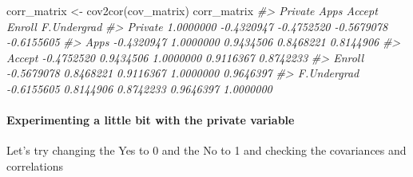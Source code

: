 \documentclass[
]{article}
\newenvironment{Shaded}{\begin{snugshade}}{\end{snugshade}}
\newcommand{\CommentTok}[1]{\textcolor[rgb]{0.56,0.35,0.01}{\textit{#1}}}
\newcommand{\DecValTok}[1]{\textcolor[rgb]{0.00,0.00,0.81}{#1}}
\newcommand{\FunctionTok}[1]{\textcolor[rgb]{0.00,0.00,0.00}{#1}}
\newcommand{\NormalTok}[1]{#1}
\newcommand{\OtherTok}[1]{\textcolor[rgb]{0.56,0.35,0.01}{#1}}
\newcommand{\SpecialCharTok}[1]{\textcolor[rgb]{0.00,0.00,0.00}{#1}}
\newcommand{\StringTok}[1]{\textcolor[rgb]{0.31,0.60,0.02}{#1}}
\begin{document}
\begin{Shaded}
\begin{Highlighting}[]
\NormalTok{corr\_matrix }\OtherTok{\textless{}{-}} \FunctionTok{cov2cor}\NormalTok{(cov\_matrix)}
\NormalTok{corr\_matrix}
\CommentTok{\#\textgreater{}                Private       Apps     Accept     Enroll F.Undergrad}
\CommentTok{\#\textgreater{} Private      1.0000000 {-}0.4320947 {-}0.4752520 {-}0.5679078  {-}0.6155605}
\CommentTok{\#\textgreater{} Apps        {-}0.4320947  1.0000000  0.9434506  0.8468221   0.8144906}
\CommentTok{\#\textgreater{} Accept      {-}0.4752520  0.9434506  1.0000000  0.9116367   0.8742233}
\CommentTok{\#\textgreater{} Enroll      {-}0.5679078  0.8468221  0.9116367  1.0000000   0.9646397}
\CommentTok{\#\textgreater{} F.Undergrad {-}0.6155605  0.8144906  0.8742233  0.9646397   1.0000000}
\end{Highlighting}
\end{Shaded}

\hypertarget{experimenting-a-little-bit-with-the-private-variable}{%
\paragraph{Experimenting a little bit with the private
variable}\label{experimenting-a-little-bit-with-the-private-variable}}

Let's try changing the Yes to 0 and the No to 1 and checking the
covariances and correlations

\begin{Shaded}
\end{Shaded}
\end{document}
